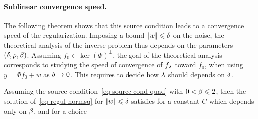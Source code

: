 \paragraph{Sublinear convergence speed.}

The following theorem shows that this source condition leads to a convergence speed of the regularization. 
%
Imposing a bound $|\!| w |\!| \leqslant \delta$ on the noise, the theoretical analysis of the inverse problem thus depends on the parameters $(\delta,\rho,\beta)$. Assuming $f_0 \in \ker(\Phi)^\bot$, the goal of the theoretical analysis corresponds to studying the speed of convergence of $f_\lambda$ toward $f_0$, when using $y=\Phi f_0+w$ as $\delta \rightarrow 0$. This requires to decide how $\lambda$ should depends on $\delta$.


\begin{thm}\label{thm-sublin-quad}
	Assuming the source condition~\eqref{eq-source-cond-quad} with $0 < \beta \leqslant 2$, then the solution of~\eqref{eq-regul-normsq} for $|\!| w |\!| \leqslant \delta$ satisfies
	for a constant $C$ which depends only on $\beta$, and
	for a choice 
\end{thm}

